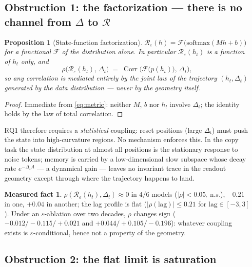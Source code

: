 \documentclass[11pt,a4paper]{article}
\newtheorem{prop}{Proposition}
\theoremstyle{definition}
\newtheorem{meas}{Measured fact}
\theoremstyle{remark}
\begin{document}
\subsection{Obstruction 1: the factorization --- there is no channel from $\Delta$ to $\mathcal{R}$}

\begin{prop}[State-function factorization]
$\mathcal{R}_\varepsilon(h) = \mathcal{F}\big(\mathrm{softmax}(Mh+b)\big)$ for a functional
$\mathcal{F}$ of the distribution alone. In particular $\mathcal{R}_\varepsilon(h_t)$ is a function
of $h_t$ only, and
\[
\rho\big(\mathcal{R}_\varepsilon(h_t),\, \Delta_t\big)
\;=\;
\operatorname{Corr}\Big(\mathcal{F}\!\big(p(h_t)\big),\, \Delta_t\Big),
\]
so any correlation is mediated \emph{entirely} by the joint law of the trajectory $(h_t, \Delta_t)$
generated by the data distribution --- never by the geometry itself.
\end{prop}

\begin{proof}
Immediate from \eqref{eq:metric}: neither $M$, $b$ nor $h_t$ involve $\Delta_t$; the identity holds
by the law of total correlation.
\end{proof}

RQ1 therefore requires a \emph{statistical} coupling: reset positions (large $\Delta_t$) must push
the state into high-curvature regions. No mechanism enforces this. In the copy task the state
distribution at almost all positions is the stationary response to noise tokens; memory is carried
by a low-dimensional slow subspace whose decay rate $e^{-\Delta_t A}$ --- a dynamical gain ---
leaves no invariant trace in the readout geometry except through where the trajectory happens to
land.

\begin{meas}
$\rho(\mathcal{R}_\varepsilon(h_t), \Delta_t) \approx 0$ in $4/6$ models ($|\rho| < 0.05$, n.s.),
$-0.21$ in one, $+0.04$ in another; the lag profile is flat ($|\rho(\mathrm{lag})| \le 0.21$ for
$\mathrm{lag} \in [-3,3]$). Under an $\varepsilon$-ablation over two decades, $\rho$ changes sign
($-0.012 / -0.115 / +0.021$ and $+0.044 / +0.105 / -0.196$): whatever coupling exists is
$\varepsilon$-conditional, hence not a property of the geometry.
\end{meas}

\subsection{Obstruction 2: the flat limit is saturation}
\end{document}
